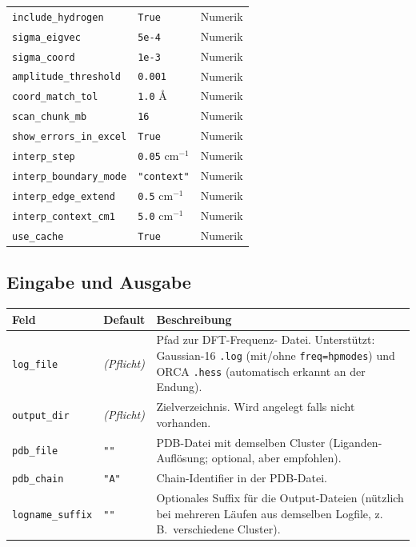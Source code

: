 \documentclass[11pt,a4paper,twoside]{article}
\theoremstyle{remark}
\begin{document}
\begin{longtable}{p{} p{} p{}}
\texttt{include\_hydrogen}          & \texttt{True}        & Numerik \\
\texttt{sigma\_eigvec}              & \texttt{5e-4}        & Numerik \\
\texttt{sigma\_coord}               & \texttt{1e-3}        & Numerik \\
\texttt{amplitude\_threshold}       & \texttt{0.001}       & Numerik \\
\texttt{coord\_match\_tol}          & \texttt{1.0} \AA     & Numerik \\
\texttt{scan\_chunk\_mb}            & \texttt{16}          & Numerik \\
\texttt{show\_errors\_in\_excel}    & \texttt{True}        & Numerik \\
\texttt{interp\_step}               & \texttt{0.05} cm$^{-1}$ & Numerik \\
\texttt{interp\_boundary\_mode}     & \texttt{"context"}   & Numerik \\
\texttt{interp\_edge\_extend}       & \texttt{0.5} cm$^{-1}$ & Numerik \\
\texttt{interp\_context\_cm1}       & \texttt{5.0} cm$^{-1}$ & Numerik \\
\texttt{use\_cache}                 & \texttt{True}        & Numerik \\
\bottomrule
\end{longtable}



\subsection{Eingabe und Ausgabe}

\begin{longtable}{p{} p{} p{}}
\toprule
\textbf{Feld} & \textbf{Default} & \textbf{Beschreibung} \\
\midrule
\endhead
\texttt{log\_file}      & \emph{(Pflicht)} & Pfad zur DFT-Frequenz-
  Datei. Unterst\"utzt: Gaussian-16 \texttt{.log} (mit/ohne
  \texttt{freq=hpmodes}) und ORCA \texttt{.hess} (automatisch
  erkannt an der Endung). \\
\texttt{output\_dir}    & \emph{(Pflicht)} & Zielverzeichnis. Wird
  angelegt falls nicht vorhanden. \\
\texttt{pdb\_file}      & \texttt{""}     & PDB-Datei mit demselben
  Cluster (Liganden-Aufl\"osung; optional, aber empfohlen). \\
\texttt{pdb\_chain}     & \texttt{"A"}     & Chain-Identifier in der
  PDB-Datei. \\
\texttt{logname\_suffix} & \texttt{""}     & Optionales Suffix f\"ur die
  Output-Dateien (n\"utzlich bei mehreren L\"aufen aus demselben Logfile,
  z.\,B.\ verschiedene Cluster). \\
\bottomrule
\end{longtable}
\end{document}
